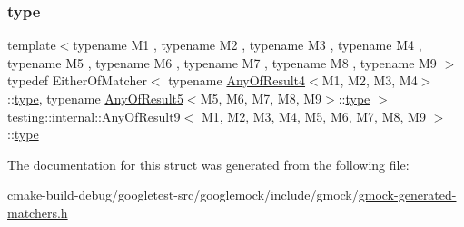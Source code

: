 \subsubsection{\texorpdfstring{type}{type}}
{\footnotesize\ttfamily template$<$typename M1 , typename M2 , typename M3 , typename M4 , typename M5 , typename M6 , typename M7 , typename M8 , typename M9 $>$ \\
typedef Either\+Of\+Matcher$<$ typename \mbox{\hyperlink{structtesting_1_1internal_1_1AnyOfResult4}{Any\+Of\+Result4}}$<$M1, M2, M3, M4$>$\+::\mbox{\hyperlink{structtesting_1_1internal_1_1AnyOfResult9_a308935fb02c62f502044dcc7b0a2b464}{type}}, typename \mbox{\hyperlink{structtesting_1_1internal_1_1AnyOfResult5}{Any\+Of\+Result5}}$<$M5, M6, M7, M8, M9$>$\+::\mbox{\hyperlink{structtesting_1_1internal_1_1AnyOfResult9_a308935fb02c62f502044dcc7b0a2b464}{type}} $>$ \mbox{\hyperlink{structtesting_1_1internal_1_1AnyOfResult9}{testing\+::internal\+::\+Any\+Of\+Result9}}$<$ M1, M2, M3, M4, M5, M6, M7, M8, M9 $>$\+::\mbox{\hyperlink{structtesting_1_1internal_1_1AnyOfResult9_a308935fb02c62f502044dcc7b0a2b464}{type}}}



The documentation for this struct was generated from the following file\+:\begin{DoxyCompactItemize}
\item 
cmake-\/build-\/debug/googletest-\/src/googlemock/include/gmock/\mbox{\hyperlink{gmock-generated-matchers_8h}{gmock-\/generated-\/matchers.\+h}}\end{DoxyCompactItemize}
